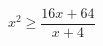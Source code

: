 \begin{ex}[type=inequality]
	\begin{condition}
		\( x^2\ge\dfrac{16x+64}{x+4} \)
	\end{condition}
\end{ex}